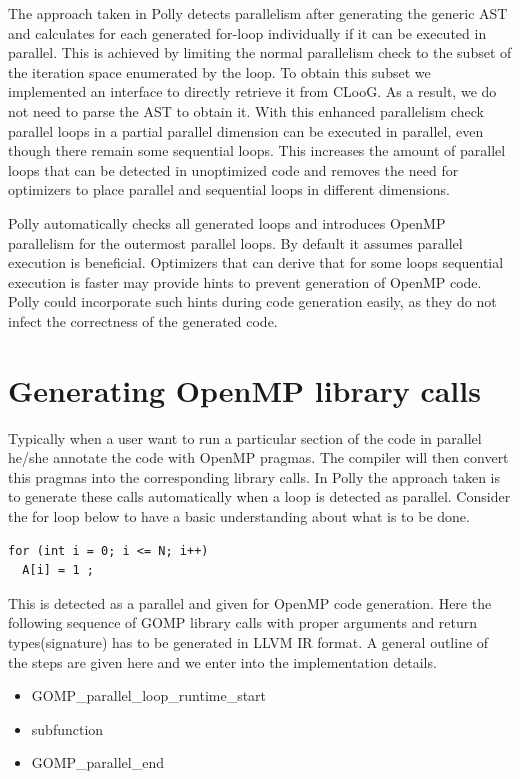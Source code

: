The approach taken in Polly detects parallelism after generating the generic
AST and calculates for each generated for-loop individually if it can be
executed in parallel. This is achieved by limiting the normal parallelism check
to the subset of the iteration space enumerated by the loop. To obtain this subset
we implemented an interface to directly retrieve it from CLooG. As a result,
we do not need to parse the AST to obtain it. With this enhanced parallelism
check parallel loops in a partial parallel dimension can be executed in
parallel, even though there remain some sequential loops. This increases the
amount of parallel loops that can be detected in unoptimized code and removes
the need for optimizers to place parallel and sequential loops in different
dimensions.

Polly automatically checks all generated loops and introduces OpenMP
parallelism for the outermost parallel loops. By default it assumes parallel
execution is beneficial. Optimizers that can derive that for some loops
sequential execution is faster may provide hints to prevent generation of
OpenMP code. Polly could incorporate such hints during code generation easily,
as they do not infect the correctness of the generated code.


\section{Generating OpenMP library calls}

Typically when a user want to run a particular section of the code in parallel he/she annotate the code with
OpenMP pragmas. The compiler will then convert this pragmas into the corresponding library calls. In Polly the
approach taken is to generate these calls automatically when a loop is detected as parallel.
Consider the for loop below to have a basic understanding about what is to be done.
{\footnotesize
\begin{lstlisting}
for (int i = 0; i <= N; i++)
  A[i] = 1 ;
\end{lstlisting}
}
This is detected as a parallel and given for OpenMP code generation. Here the following
sequence of GOMP library calls with proper arguments and return types(signature) has to be generated in
LLVM IR format. A general outline of the steps are given here and we enter into the implementation details.

\begin{itemize}
\item GOMP\_parallel\_loop\_runtime\_start
\item subfunction
\item GOMP\_parallel\_end
\end{itemize}

